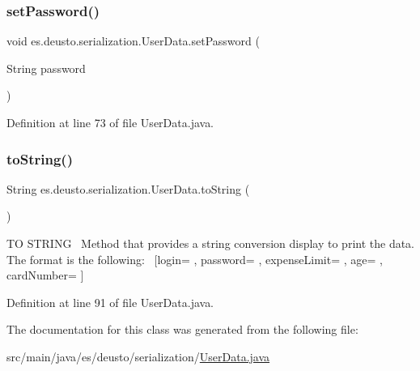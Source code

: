 \subsubsection{\texorpdfstring{set\+Password()}{setPassword()}}
{\footnotesize\ttfamily void es.\+deusto.\+serialization.\+User\+Data.\+set\+Password (\begin{DoxyParamCaption}\item[{String}]{password }\end{DoxyParamCaption})}



Definition at line 73 of file User\+Data.\+java.

\mbox{\label{classes_1_1deusto_1_1serialization_1_1_user_data_ac2a905aeaf972596d8fd135d76c763cd}} 
\subsubsection{\texorpdfstring{to\+String()}{toString()}}
{\footnotesize\ttfamily String es.\+deusto.\+serialization.\+User\+Data.\+to\+String (\begin{DoxyParamCaption}{ }\end{DoxyParamCaption})}

TO S\+T\+R\+I\+NG~\newline
Method that provides a string conversion display to print the data. The format is the following\+:~\newline
\mbox{[}login= , password= , expense\+Limit= , age= , card\+Number= \mbox{]} 

Definition at line 91 of file User\+Data.\+java.



The documentation for this class was generated from the following file\+:\begin{DoxyCompactItemize}
\item 
src/main/java/es/deusto/serialization/\hyperlink{_user_data_8java}{User\+Data.\+java}\end{DoxyCompactItemize}
